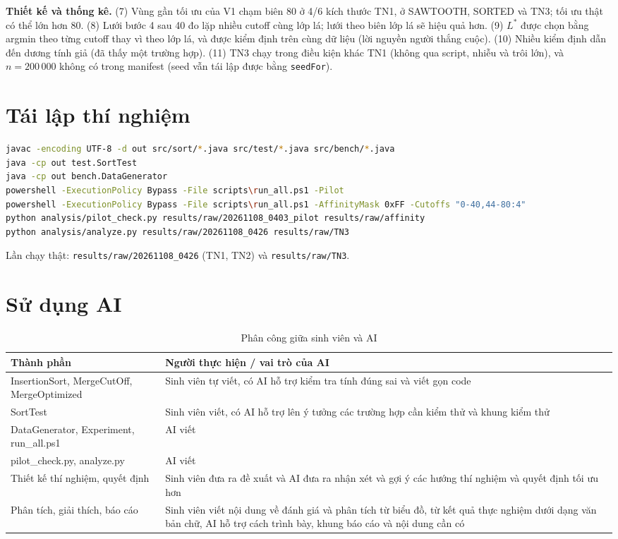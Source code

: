 \documentclass[11pt,a4paper]{article}
\begin{document}
\textbf{Thiết kế và thống kê.}
(7) Vùng gần tối ưu của V1 chạm biên 80 ở 4/6 kích thước TN1, ở SAWTOOTH, SORTED và TN3; tối ưu thật có thể lớn hơn 80.
(8) Lưới bước 4 sau 40 đo lặp nhiều cutoff cùng lớp lá; lưới theo biên lớp lá sẽ hiệu quả hơn.
(9) $L^*$ được chọn bằng argmin theo từng cutoff thay vì theo lớp lá, và được kiểm định trên cùng dữ liệu (lời nguyền người thắng cuộc).
(10) Nhiều kiểm định dẫn đến dương tính giả (đã thấy một trường hợp).
(11) TN3 chạy trong điều kiện khác TN1 (không qua script, nhiễu và trôi lớn), và $n = 200\,000$ không có trong manifest
(seed vẫn tái lập được bằng \texttt{seedFor}).

\appendix

\section{Tái lập thí nghiệm}
\begin{lstlisting}[language=bash]
javac -encoding UTF-8 -d out src/sort/*.java src/test/*.java src/bench/*.java
java -cp out test.SortTest
java -cp out bench.DataGenerator
powershell -ExecutionPolicy Bypass -File scripts\run_all.ps1 -Pilot
powershell -ExecutionPolicy Bypass -File scripts\run_all.ps1 -AffinityMask 0xFF -Cutoffs "0-40,44-80:4"
python analysis/pilot_check.py results/raw/20261108_0403_pilot results/raw/affinity
python analysis/analyze.py results/raw/20261108_0426 results/raw/TN3
\end{lstlisting}
Lần chạy thật: \texttt{results/raw/20261108\_0426} (TN1, TN2) và \texttt{results/raw/TN3}.

\section{Sử dụng AI}
\begin{table}[H]
\centering
\small
\begin{tabular}{>{\raggedright}p{}>{\raggedright\arraybackslash}p{}}
\toprule
Thành phần & Người thực hiện / vai trò của AI \\
\midrule
InsertionSort, MergeCutOff, MergeOptimized & Sinh viên tự viết, có AI hỗ trợ kiểm tra tính đúng sai và viết gọn code \\
SortTest & Sinh viên viết, có AI hỗ trợ lên ý tưởng các trường hợp cần kiểm thử và khung kiểm thử\\
DataGenerator, Experiment, run\_all.ps1 & AI viết \\
pilot\_check.py, analyze.py & AI viết \\
Thiết kế thí nghiệm, quyết định & Sinh viên đưa ra đề xuất và AI đưa ra nhận xét và gợi ý các hướng thí nghiệm và quyết định tối ưu hơn \\
Phân tích, giải thích, báo cáo & Sinh viên viết nội dung về đánh giá và phân tích từ biểu đồ, từ kết quả thực nghiệm dưới dạng văn bản chữ, AI hỗ trợ cách trình bày, khung báo cáo và nội dung cần có \\
\bottomrule
\end{tabular}
\caption{Phân công giữa sinh viên và AI}
\label{tab:ai}
\end{table}
\end{document}
